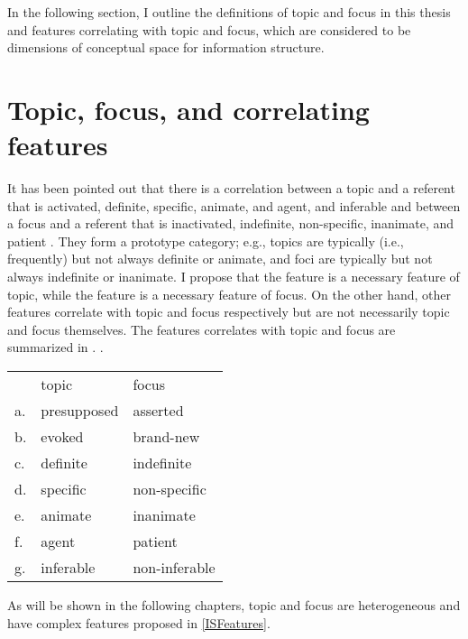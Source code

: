 In the following section,
I outline the definitions of topic and focus in this thesis and
features correlating with topic and focus,
which are considered to be dimensions of conceptual space for information structure.

\section{Topic, focus, and correlating features}\label{FrameworkDefinition}

It has been pointed out that
there is a correlation between a topic and
a referent that is activated, definite, specific, animate, and agent, and inferable
and between a focus and
a referent that is inactivated, indefinite, non-specific, inanimate, and patient
\cite{givon76,keenan76,comrie79,comrie83}.
They form a prototype category;
e.g., topics are typically (i.e., frequently) but not always definite or animate, and
foci are typically but not always indefinite or inanimate.
I propose that
the feature  is a necessary feature of topic,
while the feature  is a necessary feature of focus.
On the other hand, other features correlate with topic and focus respectively but are not necessarily topic and focus themselves.
The features correlates with topic and focus are summarized in \Next.
\ex.\label{ISFeatures}
\begin{tabular}{lll}
	 & topic & focus \\
	a. & presupposed & asserted \\
	b. & evoked & brand-new \\
	c. & definite & indefinite \\
	d. & specific & non-specific \\
	e. & animate & inanimate \\
	f. & agent & patient \\
	g. & inferable & non-inferable \\
\end{tabular}

As will be shown in the following chapters,
topic and focus are heterogeneous
and have complex features proposed in \ref{ISFeatures}.

